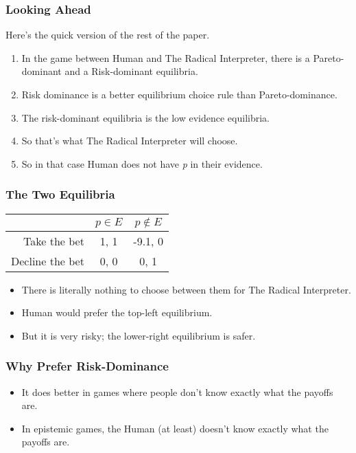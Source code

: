\begin{frame}

\frametitle{Looking Ahead}
\label{lookingahead}

Here's the quick version of the rest of the paper.

\begin{enumerate}
\item In the game between Human and The Radical Interpreter, there is a Pareto-dominant and a Risk-dominant equilibria.

\item Risk dominance is a better equilibrium choice rule than Pareto-dominance.

\item The risk-dominant equilibria is the low evidence equilibria.

\item So that's what The Radical Interpreter will choose.

\item So in that case Human does not have \emph{p} in their evidence.

\end{enumerate}
\end{frame}

\begin{frame}

\frametitle{The Two Equilibria}
\label{thetwoequilibria}


\begin{center}
\begin{tabular}{r | c c}
& $p \in E$ & $p \notin E$ \\ \hline
Take the bet & 1, 1 & -9.1, 0 \\
Decline the bet & 0, 0 & 0, 1
\end{tabular}
\end{center}


\begin{itemize}
\item There is literally nothing to choose between them for The Radical Interpreter.

\item Human would prefer the top-left equilibrium.

\item But it is very risky; the lower-right equilibrium is safer.

\end{itemize}
\end{frame}

\begin{frame}

\frametitle{Why Prefer Risk-Dominance}
\label{whypreferrisk-dominance}

\begin{itemize}
\item It does better in games where people don't know exactly what the payoffs are.

\item In epistemic games, the Human (at least) doesn't know exactly what the payoffs are.

\end{itemize}
\end{frame}

